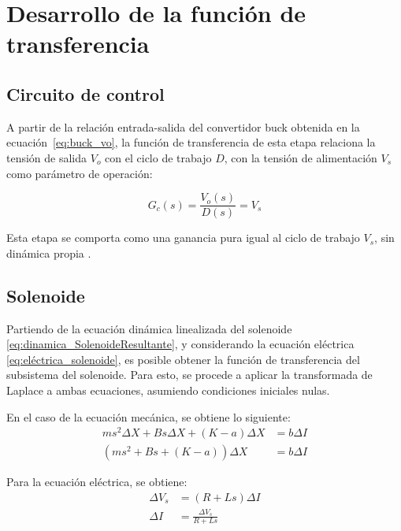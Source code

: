 \documentclass[journal]{IEEEtran}
\begin{document}
\section{Desarrollo de la función de transferencia}

\subsection{Circuito de control}

A partir de la relación entrada-salida del convertidor buck obtenida 
en la ecuación~\eqref{eq:buck_vo}, la función de transferencia de 
esta etapa relaciona la tensión de salida $V_o$  con el ciclo de trabajo $D$,
con la tensión de alimentación $V_s$ como parámetro de operación:

\begin{equation}
    G_c(s) = \frac{V_o(s)}{D(s)} = V_s
    \label{eq:gc}
\end{equation}

Esta etapa se comporta como una ganancia pura igual al ciclo de 
trabajo $V_s$, sin dinámica propia \cite{hart2011}.

\subsection{Solenoide}

Partiendo de la ecuación dinámica linealizada del solenoide \ref{eq:dinamica_SolenoideResultante}, y 
considerando la ecuación eléctrica \ref{eq:eléctrica_solenoide}, es posible obtener la función de transferencia 
del subsistema del solenoide. Para esto, se procede a aplicar la transformada de Laplace a ambas ecuaciones, 
asumiendo condiciones iniciales nulas.

En el caso de la ecuación mecánica, se obtiene lo siguiente:
\begin{equation}
\begin{aligned}
    m s^2 \Delta X + B s\Delta X + (K - a)\Delta X &= b \Delta I \\
    (m s^2 + B s + (K - a)) \Delta X &= b \Delta I
\end{aligned}
\label{eq:laplace_mecanicaSolenoide}
\end{equation}
    
Para la ecuación eléctrica, se obtiene:
\begin{equation}
\begin{aligned}
    \Delta V_s &= (R + L s) \Delta I \\
    \Delta I &= \frac{\Delta V_s}{R + L s}
\end{aligned}
\label{eq:laplace_electricaSolenoide}
\end{equation}
\end{document}
